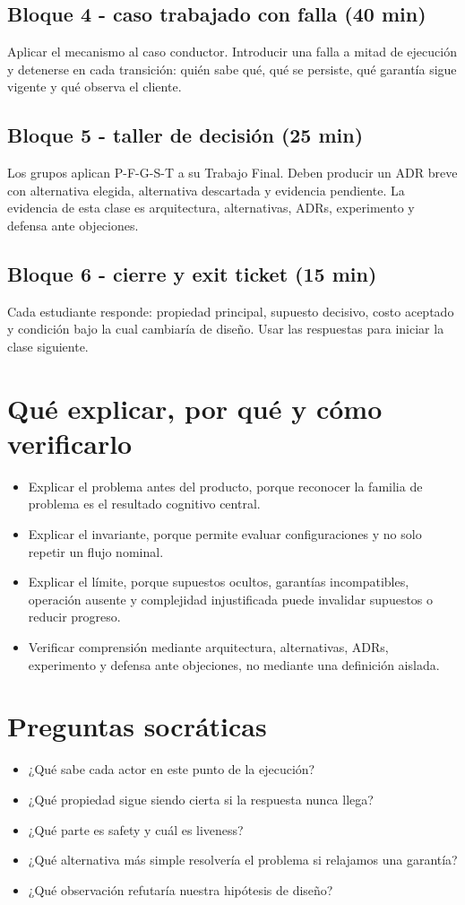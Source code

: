 \documentclass[variant=docente,cover=institutional,mode=screen]{ua-engineering-v6-article}
\begin{document}
\subsection*{Bloque 4 - caso trabajado con falla (40 min)}
Aplicar el mecanismo al caso conductor. Introducir una falla a mitad de ejecución y detenerse en cada transición: quién sabe qué, qué se persiste, qué garantía sigue vigente y qué observa el cliente.

\subsection*{Bloque 5 - taller de decisión (25 min)}
Los grupos aplican P-F-G-S-T a su Trabajo Final. Deben producir un ADR breve con alternativa elegida, alternativa descartada y evidencia pendiente. La evidencia de esta clase es arquitectura, alternativas, ADRs, experimento y defensa ante objeciones.

\subsection*{Bloque 6 - cierre y exit ticket (15 min)}
Cada estudiante responde: propiedad principal, supuesto decisivo, costo aceptado y condición bajo la cual cambiaría de diseño. Usar las respuestas para iniciar la clase siguiente.

\section{Qué explicar, por qué y cómo verificarlo}
\begin{itemize}
\item Explicar el problema antes del producto, porque reconocer la familia de problema es el resultado cognitivo central.
\item Explicar el invariante, porque permite evaluar configuraciones y no solo repetir un flujo nominal.
\item Explicar el límite, porque supuestos ocultos, garantías incompatibles, operación ausente y complejidad injustificada puede invalidar supuestos o reducir progreso.
\item Verificar comprensión mediante arquitectura, alternativas, ADRs, experimento y defensa ante objeciones, no mediante una definición aislada.
\end{itemize}

\section{Preguntas socráticas}
\begin{itemize}
\item ¿Qué sabe cada actor en este punto de la ejecución?
\item ¿Qué propiedad sigue siendo cierta si la respuesta nunca llega?
\item ¿Qué parte es safety y cuál es liveness?
\item ¿Qué alternativa más simple resolvería el problema si relajamos una garantía?
\item ¿Qué observación refutaría nuestra hipótesis de diseño?
\end{itemize}
\end{document}
